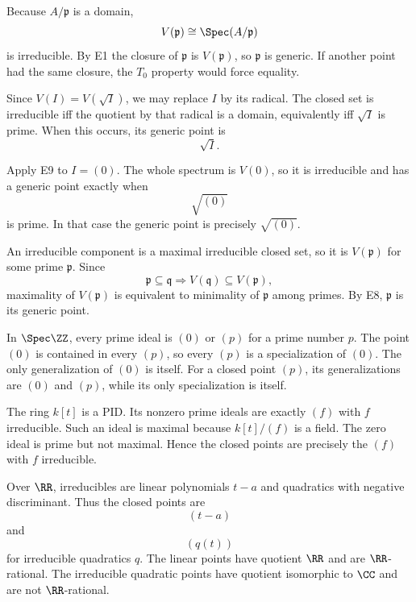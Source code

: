 \begin{solution}[E8]
Because $A/\mathfrak p$ is a domain,
\[
V(\mathfrak p)\cong\Spec(A/\mathfrak p)
\]
is irreducible.  By E1 the closure of $\mathfrak p$ is $V(\mathfrak p)$, so
$\mathfrak p$ is generic.  If another point had the same closure, the $T_0$ property would
force equality.
\end{solution}

\begin{solution}[E9]
Since $V(I)=V(\sqrt I)$, we may replace $I$ by its radical.  The closed set is irreducible
iff the quotient by that radical is a domain, equivalently iff $\sqrt I$ is prime.  When
this occurs, its generic point is
\[
\sqrt I.
\]
\end{solution}

\begin{solution}[E10]
Apply E9 to $I=(0)$.  The whole spectrum is $V(0)$, so it is irreducible and has a generic
point exactly when
\[
\sqrt{(0)}
\]
is prime.  In that case the generic point is precisely $\sqrt{(0)}$.
\end{solution}

\begin{solution}[E11]
An irreducible component is a maximal irreducible closed set, so it is $V(\mathfrak p)$
for some prime $\mathfrak p$.  Since
\[
\mathfrak p\subseteq\mathfrak q
\Longrightarrow
V(\mathfrak q)\subseteq V(\mathfrak p),
\]
maximality of $V(\mathfrak p)$ is equivalent to minimality of $\mathfrak p$ among primes.
By E8, $\mathfrak p$ is its generic point.
\end{solution}

\begin{solution}[E12]
In $\Spec\ZZ$, every prime ideal is $(0)$ or $(p)$ for a prime number $p$.  The point
$(0)$ is contained in every $(p)$, so every $(p)$ is a specialization of $(0)$.  The only
generalization of $(0)$ is itself.  For a closed point $(p)$, its generalizations are
$(0)$ and $(p)$, while its only specialization is itself.
\end{solution}

\begin{solution}[E13]
The ring $k[t]$ is a PID.  Its nonzero prime ideals are exactly $(f)$ with $f$ irreducible.
Such an ideal is maximal because $k[t]/(f)$ is a field.  The zero ideal is prime but not
maximal.  Hence the closed points are precisely the $(f)$ with $f$ irreducible.
\end{solution}

\begin{solution}[E14]
Over $\RR$, irreducibles are linear polynomials $t-a$ and quadratics with negative
discriminant.  Thus the closed points are
\[
(t-a)
\]
and
\[
(q(t))
\]
for irreducible quadratics $q$.  The linear points have quotient $\RR$ and are
$\RR$-rational.  The irreducible quadratic points have quotient isomorphic to $\CC$ and
are not $\RR$-rational.
\end{solution}

